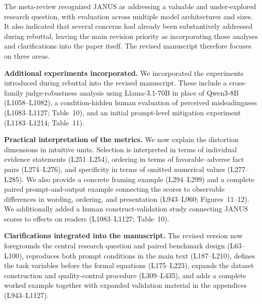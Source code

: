 \documentclass[11pt,a4paper]{article}
\begin{document}
The meta-review recognized JANUS as addressing a valuable and
under-explored research question, with evaluation across multiple model
architectures and sizes. It also indicated that several concerns had already
been substantively addressed during rebuttal, leaving the main revision
priority as incorporating those analyses and clarifications into the paper
itself. The revised manuscript therefore focuses on three areas.

\textbf{Additional experiments incorporated.}
We incorporated the experiments introduced during rebuttal into the revised
manuscript. These include a cross-family judge-robustness analysis using
Llama-3.1-70B in place of Qwen3-8B (L1058--L1082), a condition-hidden
human evaluation of perceived misleadingness (L1083--L1127; Table~10),
and an initial prompt-level mitigation experiment (L1183--L1214;
Table~11).

\textbf{Practical interpretation of the metrics.}
We now explain the distortion dimensions in intuitive units. Selection is
interpreted in terms of individual evidence statements (L251--L254),
ordering in terms of favorable--adverse fact pairs (L274--L276), and
specificity in terms of omitted numerical values (L277--L285). We also
provide a concrete framing example (L294--L299) and a complete paired
prompt-and-output example connecting the scores to observable differences
in wording, ordering, and presentation (L943--L960; Figures~11--12).
We additionally added a human construct-validation study connecting JANUS
scores to effects on readers (L1083--L1127; Table~10).

\textbf{Clarifications integrated into the manuscript.}
The revised version now foregrounds the central research question and paired
benchmark design (L63--L100), reproduces both prompt conditions in the main
text (L187--L210), defines the task variables before the formal equations
(L175--L223), expands the dataset construction and quality-control
procedure (L309--L435), and adds a complete worked example together with
expanded validation material in the appendices (L943--L1127). 
\end{document}
